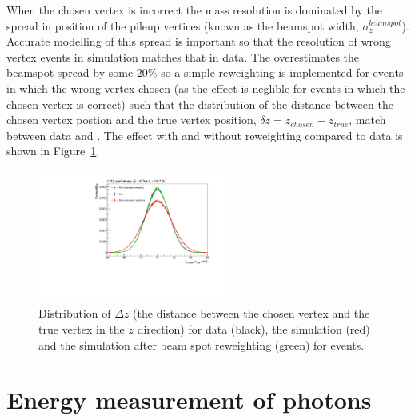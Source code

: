 When the chosen vertex is incorrect the mass resolution is dominated by the spread in position of the pileup vertices (known as the beamspot width, $\sigma_{z}^{beamspot}$). Accurate modelling of this spread is important so that the resolution of wrong vertex events in simulation matches that in data. The \MC overestimates the beamspot spread by some 20\% so a simple reweighting is implemented for \MC events in which the wrong vertex chosen (as the effect is neglible for events in which the chosen vertex is correct) such that the distribution of the distance between the chosen vertex postion and the true vertex position, $\delta z=z_{chosen}-z_{true}$, match between data and \MC. The effect with and without reweighting compared to data is shown in Figure~\ref{fig:beamspot}.

\begin{figure}
  \begin{center}
  \includegraphics[width=0.55\textwidth]{analysis_comps/plots/beamspot.pdf}
  \caption[Distribution of $\Delta z$ (the distance between the chosen vertex and the true vertex in the $z$ direction]{Distribution of $\Delta z$ (the distance between the chosen vertex and the true vertex in the $z$ direction) for data (black), the \MC simulation (red) and the \MC simulation after beam spot reweighting (green) for \Zmumu events.}
  \label{fig:beamspot}
  \end{center}
\end{figure}

\section{Energy measurement of photons}
\label{sec:photon_energy}

